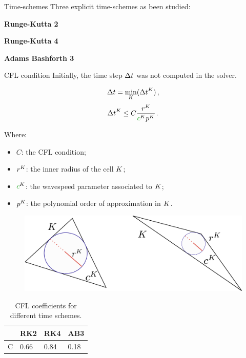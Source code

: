 \begin{frame}[noframenumbering]{Time-schemes}
\scriptsize
Three explicit time-schemes as been studied: \\
\begin{multicols}{3}
\textbf{Runge-Kutta 2}

\columnbreak

\textbf{Runge-Kutta 4}

\columnbreak

\textbf{Adams Bashforth 3}
\end{multicols}

\begin{block}{CFL condition}
Initially, the time step ${\Delta t}$ was not computed in the solver.

\begin{multicols}{2}
\begin{equation}
{\Delta t} = \underset{{K}}{\min}({\Delta t}^{K})\,,
\end{equation}
\begin{equation}
        \deltat^\elementK \le C \frac{r^\elementK}{\velocity^\elementK p^\elementK}\,.
\end{equation}
\vfill

\columnbreak
\tiny
Where:
\begin{itemize}
\item $C$: the CFL condition;
\item $r^{K}$: the inner radius of the cell ${K}$;
\item $\velocity^\elementK$: the wavespeed parameter associated to ${K}$;
\item $p^{K}$: the polynomial order of approximation in ${K}$.
\end{itemize}
\end{multicols}
\end{block}
\begin{overprint}
\begin{figure}[H]
\centering
\includegraphics[scale=0.2]{image/cfl.pdf}
\label{cfl_sketch}
\end{figure}
\begin{table}[H]
\centering
\begin{tabular}{|l|l|l|l|}
\hline
  & RK2  & RK4  & AB3  \\ \hline
C & 0.66 & 0.84 & 0.18 \\ \hline
\end{tabular}
\caption*{CFL coefficients for different time schemes.}
\label{coef_cfl}
\end{table}
\end{overprint}

\end{frame}


